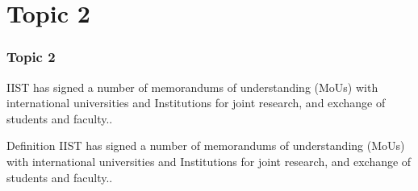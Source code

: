 \documentclass[hyperref={bookmarks=false},aspectratio=169]{beamer}
\begin{document}
\section{Topic 2}

\begin{frame}
\frametitle{Topic 2 }

IIST has signed a number of memorandums of understanding (MoUs) with international universities and Institutions for joint research, and exchange of  \alert{students and faculty.}.

\begin{block}{Definition}
IIST has signed a number of memorandums of understanding (MoUs) with international universities and Institutions for joint research, and exchange of  \alert{students and faculty.}.
\end{block}


\end{frame}
\end{document}
